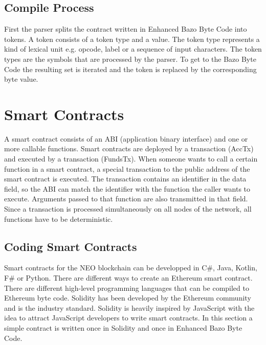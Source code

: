 \subsection{Compile Process}
First the parser splits the contract written in \flqq Enhanced Bazo Byte Code\frqq{} into tokens. A token consists of a token type and a value. The token type represents a kind of lexical unit e.g. opcode, label or a sequence of input characters. The token types are the symbols that are processed by the parser. \cite{aho_compilers:_2007} To get to the \flqq Bazo Byte Code\frqq{} the resulting set is iterated and the token is replaced by the corresponding byte value.

\section{Smart Contracts}
A smart contract consists of an ABI (application binary interface) and one or more callable functions. Smart contracts are deployed by a transaction (AccTx) and executed by a transaction (FundsTx). When someone wants to call a certain function in a smart contract, a special transaction to the public address of the smart contract is executed. The transaction contains an identifier in the data field, so the ABI can match the identifier with the function the caller wants to execute. Arguments passed to that function are also transmitted in that field. Since a transaction is processed simultaneously on all nodes of the network, all functions have to be deterministic.

\subsection{Coding Smart Contracts}
Smart contracts for the NEO blockchain can be developped in C\#, Java, Kotlin, F\# or Python. \cite{neo_whitepaper} There are different ways to create an Ethereum smart contract. There are different high-level programming languages that can be compiled to Ethereum byte code. Solidity has been developed by the Ethereum community and is the industry standard. Solidity is heavily inspired by JavaScript with the idea to attract JavaScript developers to write smart contracts. In this section a simple contract is written once in Solidity and once in \flqq Enhanced Bazo Byte Code\frqq.

